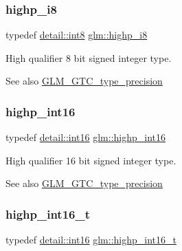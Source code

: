 \subsubsection{\texorpdfstring{highp\+\_\+i8}{highp\_i8}}
{\footnotesize\ttfamily typedef \mbox{\hyperlink{namespaceglm_1_1detail_a04b526a8d7a9b455602a0afa78c531e0}{detail\+::int8}} \mbox{\hyperlink{group__gtc__type__precision_ga8b9eb0b24cce7f14478bfcacb53ce839}{glm\+::highp\+\_\+i8}}}

High qualifier 8 bit signed integer type. \begin{DoxySeeAlso}{See also}
\mbox{\hyperlink{group__gtc__type__precision}{G\+L\+M\+\_\+\+G\+T\+C\+\_\+type\+\_\+precision}} 
\end{DoxySeeAlso}
\mbox{\label{group__gtc__type__precision_gaf0430ed80e88c0d1dfbe47f359659c81}} 
\subsubsection{\texorpdfstring{highp\+\_\+int16}{highp\_int16}}
{\footnotesize\ttfamily typedef \mbox{\hyperlink{namespaceglm_1_1detail_a375938874ca4f0a0982ec6373b56117b}{detail\+::int16}} \mbox{\hyperlink{group__gtc__type__precision_gaf0430ed80e88c0d1dfbe47f359659c81}{glm\+::highp\+\_\+int16}}}

High qualifier 16 bit signed integer type. \begin{DoxySeeAlso}{See also}
\mbox{\hyperlink{group__gtc__type__precision}{G\+L\+M\+\_\+\+G\+T\+C\+\_\+type\+\_\+precision}} 
\end{DoxySeeAlso}
\mbox{\label{group__gtc__type__precision_ga07d318d61472e75238e53b9642227672}} 
\subsubsection{\texorpdfstring{highp\+\_\+int16\+\_\+t}{highp\_int16\_t}}
{\footnotesize\ttfamily typedef \mbox{\hyperlink{namespaceglm_1_1detail_a375938874ca4f0a0982ec6373b56117b}{detail\+::int16}} \mbox{\hyperlink{group__gtc__type__precision_ga07d318d61472e75238e53b9642227672}{glm\+::highp\+\_\+int16\+\_\+t}}}

